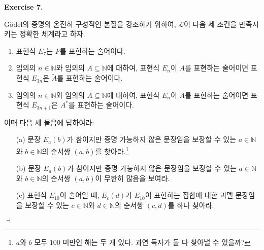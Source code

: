 \documentclass[12pt]{paper}
\newenvironment{context}[1][]
{ \noindent \textbf{{#1}.}
}
{ \hfill $ \dashv $
}
\begin{document}
\begin{context}[Exercise 7]
G\"odel의 증명의 온전히 구성적인 본질을 강조하기 위하여,
$\mathcal{L}$이 다음 세 조건을 만족시키는 정확한 체계라고 하자.
\begin{enumerate}
\item 표현식 $E_{7}$는 $P$를 표현하는 술어이다.
\item 임의의 $n \in \mathbb{N}$와 임의의 $A \subseteq \mathbb{N}$에 대하여, 표현식 $E_{n}$이 $A$를 표현하는 술어이면 표현식 $E_{3 n}$은 $\tilde{A}$를 표현하는 술어이다.
\item 임의의 $n \in \mathbb{N}$와 임의의 $A \subseteq \mathbb{N}$에 대하여, 표현식 $E_{n}$이 $A$를 표현하는 술어이면 표현식 $E_{3 n + 1}$은 $A^{*}$를 표현하는 술어이다.
\end{enumerate}

이때 다음 세 물음에 답하여라:
\begin{itemize}
\item[(a)] 문장 $E_{a} \left( b \right)$가 참이지만 증명 가능하지 않은 문장임을 보장할 수 있는 $a \in \mathbb{N}$와 $b \in \mathbb{N}$의 순서쌍 $\left( a , b \right)$를 찾아라.\footnote
{
$a$와 $b$ 모두 $100$ 미만인 해는 두 개 있다.
과연 독자가 둘 다 찾아낼 수 있을까?
}
\item[(b)] 문장 $E_{a} \left( b \right)$가 참이지만 증명 가능하지 않은 문장임을 보장할 수 있는 $a \in \mathbb{N}$와 $b \in \mathbb{N}$의 순서쌍 $\left( a , b \right)$이 무한히 많음을 보여라.
\item[(c)] 표현식 $E_{10}$이 술어일 때, $E_{c} \left( d \right)$가 $E_{10}$이 표현하는 집합에 대한 괴델 문장임을 보장할 수 있는 $c \in \mathbb{N}$와 $d \in \mathbb{N}$의 순서쌍 $\left( c , d \right)$를 하나 찾아라.
\end{itemize}
\end{context}
\end{document}
